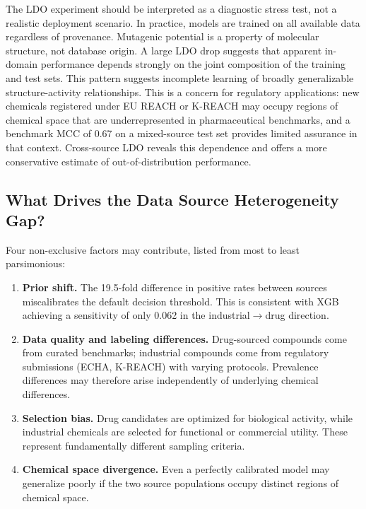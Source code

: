 \documentclass[journal=jacsat,manuscript=article]{achemso}
\begin{document}
The LDO experiment should be interpreted as a diagnostic stress test, not a realistic 
deployment scenario. In practice, models are trained on all available data regardless of 
provenance. Mutagenic potential is a property of molecular structure, not database origin. 
A large LDO drop suggests that apparent in-domain performance depends strongly on the 
joint composition of the training and test sets. This pattern suggests incomplete learning 
of broadly generalizable structure-activity relationships. 
This is a concern for regulatory applications: new chemicals registered under EU REACH or 
K-REACH may occupy regions of chemical space that are underrepresented in pharmaceutical 
benchmarks, and a benchmark MCC of 0.67 on a mixed-source test set provides limited 
assurance in that context. Cross-source LDO reveals this dependence and offers a more 
conservative estimate of out-of-distribution performance.

\subsection{What Drives the Data Source Heterogeneity Gap?}

Four non-exclusive factors may contribute, listed from most to least parsimonious:

\begin{enumerate}
    \item \textbf{Prior shift.} The 19.5-fold difference in positive rates between sources 
    miscalibrates the default decision threshold. This is consistent with XGB achieving a 
    sensitivity of only 0.062 in the industrial$\to$drug direction.

    \item \textbf{Data quality and labeling differences.} Drug-sourced compounds come from 
    curated benchmarks; industrial compounds come from regulatory submissions (ECHA, 
    K-REACH) with varying protocols. Prevalence differences may therefore arise independently 
    of underlying chemical differences.

    \item \textbf{Selection bias.} Drug candidates are optimized for biological activity, 
    while industrial chemicals are selected for functional or commercial utility. These 
    represent fundamentally different sampling criteria.

    \item \textbf{Chemical space divergence.\cite{Lipinski_2004,Veber_2002}} Even a 
    perfectly calibrated model may generalize poorly if the two source populations occupy 
    distinct regions of chemical space.
\end{enumerate}
\end{document}
